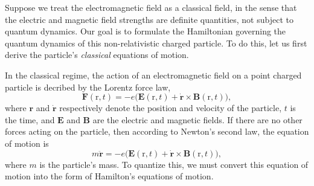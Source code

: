 \documentclass[pra,12pt]{revtex4}
\begin{document}
Suppose we treat the electromagnetic field as a classical field, in
the sense that the electric and magnetic field strengths are definite
quantities, not subject to quantum dynamics.  Our goal is to formulate
the Hamiltonian governing the quantum dynamics of this
non-relativistic charged particle.  To do this, let us first derive
the particle's \textit{classical} equations of motion.

In the classical regime, the action of an electromagnetic field on a
point charged particle is decribed by the Lorentz force law,
\begin{equation}
  \mathbf{F}(\mathrm{r},t) = -e\Big(\mathbf{E}(\mathrm{r},t)
  + \dot{\mathbf{r}}\times \mathbf{B}(\mathrm{r},t)\Big),
\end{equation}
where $\mathbf{r}$ and $\dot{\mathbf{r}}$ respectively denote the
position and velocity of the particle, $t$ is the time, and
$\mathbf{E}$ and $\mathbf{B}$ are the electric and magnetic fields.
If there are no other forces acting on the particle, then according to
Newton's second law, the equation of motion is
\begin{equation}
  m\ddot{\mathbf{r}} = -e\Big(\mathbf{E}(\mathrm{r},t)
  + \dot{\mathbf{r}} \times \mathbf{B}(\mathrm{r},t)\Big),
  \label{eom}
\end{equation}
where $m$ is the particle's mass.  To quantize this, we must convert
this equation of motion into the form of Hamilton's equations of
motion.
\end{document}
